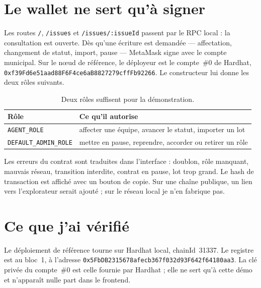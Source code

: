 \documentclass[11pt,a4paper,parskip=half,DIV=12,headinclude,footinclude]{scrartcl}
\begin{document}
\section{Le wallet ne sert qu'à signer}

Les routes \texttt{/}, \texttt{/issues} et \texttt{/issues/:issueId} passent par
le RPC local : la consultation est ouverte. Dès qu'une écriture est demandée ---
affectation, changement de statut, import, pause --- MetaMask signe avec le
compte municipal. Sur le nœud de référence, le déployeur est le compte~\#0 de
Hardhat, \texttt{0xf39Fd6e51aad88F6F4ce6aB8827279cffFb92266}. Le constructeur
lui donne les deux rôles suivants.

\begin{table}[htbp]
\centering
\caption{Deux rôles suffisent pour la démonstration.}
\begin{tabularx}{\textwidth}{@{}lX@{}}
\toprule
\rowcolor{brandsoft}\color{ink}
\textbf{Rôle} & \textbf{Ce qu'il autorise} \\
\midrule
\texttt{AGENT\_ROLE} & affecter une équipe, avancer le statut, importer un lot \\
\texttt{DEFAULT\_ADMIN\_ROLE} & mettre en pause, reprendre, accorder ou retirer un rôle \\
\bottomrule
\end{tabularx}
\end{table}

Les erreurs du contrat sont traduites dans l'interface : doublon, rôle manquant,
mauvais réseau, transition interdite, contrat en pause, lot trop grand. Le hash
de transaction est affiché avec un bouton de copie. Sur une chaîne publique, un
lien vers l'explorateur serait ajouté ; sur le réseau local je n'en fabrique pas.

\section{Ce que j'ai vérifié}

Le déploiement de référence tourne sur Hardhat local, chainId~31337. Le registre
est au bloc~1, à l'adresse
\texttt{0x5FbDB2315678afecb367f032d93F642f64180aa3}. La clé privée du compte~\#0
est celle fournie par Hardhat ; elle ne sert qu'à cette démo et n'apparaît
nulle part dans le frontend.
\end{document}
